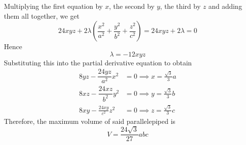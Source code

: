 \documentclass[../../Main.tex]{subfiles}
\begin{document}
Multiplying the first equation by $x$, the second by $y$, the third by $z$ and adding them all together, we get 
\begin{equation*}
    24xyz+2\lambda\left(\dfrac{x^2}{a^2}+\dfrac{y^2}{b^2}+\dfrac{z^2}{c^2}\right) = 24xyz+2\lambda=0
\end{equation*}
Hence
\begin{equation*}
    \lambda=-12xyz
\end{equation*}
Substituting this into the partial derivative equation to obtain
\begin{align*}
    8yz-\dfrac{24yz}{a^2}x^2&=0\implies x=\frac{\sqrt{3}}{3}a\\
    8xz-\dfrac{24xz}{b^2}y^2&=0\implies y=\frac{\sqrt{3}}{3}b\\
    8xy-\frac{24xy}{c^2}z^2&=0\implies z=\frac{\sqrt{3}}{3}c
\end{align*}
Therefore, the maximum volume of said parallelepiped is 
\begin{equation*}
    V=\frac{24\sqrt{3}}{27}abc
\end{equation*}
\end{document}
